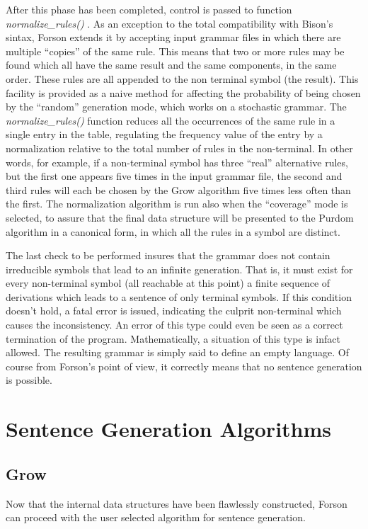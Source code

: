\documentclass[a4paper,12pt]{article}
\begin{document}
After this phase has been completed, control is passed to function \emph{normalize\_rules()} .
As an exception to the total compatibility with Bison's sintax, Forson extends it by accepting input grammar files in which there are multiple ``copies'' of the same rule. This means that two or more rules may be found which all have the same result and the same components, in the same order.
These rules are all appended to the non terminal symbol (the result). This facility is provided as a naive method for affecting the probability of being chosen by the ``random'' generation mode, which works on a stochastic grammar.
The \emph{normalize\_rules()} function reduces all the occurrences of the same rule in a single entry in the table, regulating the frequency value of the entry by a normalization relative to the total number of rules in the non-terminal. In other words, for example, if a non-terminal symbol has three ``real'' alternative rules, but the first one appears five times in the input grammar file, the second and third rules will each be chosen by the Grow algorithm five times less often than the first.
The normalization algorithm is run also when the ``coverage'' mode is selected, to assure that the final data structure will be presented to the Purdom algorithm in a canonical form, in which all the rules in a symbol are distinct.

The last check to be performed insures that the grammar does not contain irreducible symbols that lead to an infinite generation. That is, it must exist for every non-terminal symbol (all reachable at this point) a finite sequence of derivations which leads to a sentence of only terminal symbols.
If this condition doesn't hold, a fatal error is issued, indicating the culprit non-terminal which causes the inconsistency.
An error of this type could even be seen as a correct termination of the program. Mathematically, a situation of this type is infact allowed. The resulting grammar is simply said to define an empty language. Of course from Forson's point of view, it correctly means that no sentence generation is possible.


\section{Sentence Generation Algorithms}

\subsection{Grow}
Now that the internal data structures have been flawlessly constructed, Forson can proceed with the user selected algorithm for sentence generation.
\end{document}
